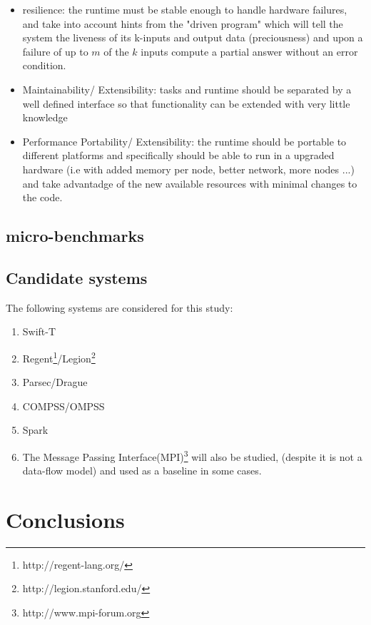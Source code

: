 \documentclass[11pt,a4paper]{article}
\begin{document}
\begin{itemize}
\item resilience: the runtime must be stable enough to handle hardware failures, and take into account hints from the "driven program" which will tell the system the liveness of its k-inputs and output data (preciousness) and upon a failure of up to $m$ of the $k$ inputs compute a partial answer without an error condition.
\item Maintainability/ Extensibility: tasks and runtime should be separated by a well defined interface so that functionality can be extended with very little knowledge 
\item Performance Portability/ Extensibility: the runtime should be portable to different platforms and specifically should be able to run in a upgraded hardware (i.e with added memory per node, better network, more nodes ...) and take advantadge of the new available resources with minimal changes to the code.
\end{itemize}

\subsection{micro-benchmarks}

\subsection{Candidate systems}
The following systems are considered for this study:
\begin{enumerate}
\item Swift-T 
\item Regent\footnote{http://regent-lang.org/}/Legion\footnote{http://legion.stanford.edu/}
\item Parsec/Drague
\item COMPSS/OMPSS
\item Spark
\item The Message Passing Interface(MPI)\footnote{http://www.mpi-forum.org} will also be studied,
(despite it is not a data-flow model) and used as a baseline in some cases.
\end{enumerate}







\section{Conclusions}



%

\end{document}
